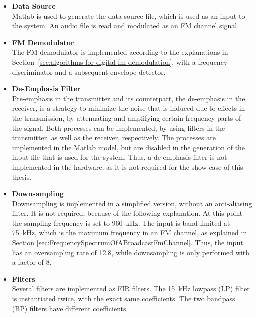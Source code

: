 \begin{itemize}
  \item \textbf{Data Source}\\
      Matlab is used to generate the data source file, which is used as an input to the system.
      An audio file is read and modulated as an FM channel signal.\\

  \item \textbf{FM Demodulator}\\
      The FM demodulator is implemented according to the explanations in Section~\ref{sec:algorithms-for-digital-fm-demodulation}, with a frequency discriminator and a subsequent envelope detector.\\

  \item \textbf{De-Emphasis Filter}\\
      Pre-emphasis in the transmitter and its counterpart, the de-emphasis in the receiver, is a strategy to minimize the noise that is induced due to effects in the transmission, by attenuating and amplifying certain frequency parts of the signal.
      Both processes can be implemented, by using filters in the transmitter, as well as the receiver, respectively.
      The processes are implemented in the Matlab model, but are disabled in the generation of the input file that is used for the system.
      Thus, a de-emphasis filter is not implemented in the hardware, as it is not required for the show-case of this thesis.

  \item \textbf{Downsampling}\\
      Downsampling is implemented in a simplified version, without an anti-aliasing filter.
      It is not required, because of the following explanation.
      At this point the sampling frequency is set to 960~kHz.
      The input is band-limited at 75~kHz, which is the maximum frequency in an FM channel, as explained in Section \ref{sec:FrequencySpectrumOfABroadcastFmChannel}.
      Thus, the input has an oversampling rate of 12.8, while downsampling is only performed with a factor of 8.\\

  \item \textbf{Filters}\\
      Several filters are implemented as FIR filters.
      The 15~kHz lowpass (LP) filter is instantiated twice, with the exact same coefficients.
      The two bandpass (BP) filters have different coefficients.\\


\end{itemize}

